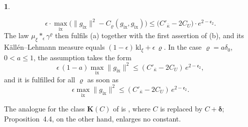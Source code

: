 \documentclass[11pt]{amsart}
\newcommand{\namedhead}{}
\theoremstyle{definition}
\newtheorem*{namedinner}{\namedhead}
\newenvironment{named}[1]{\renewcommand{\namedhead}{#1}\begin{namedinner}}{\end{namedinner}}
\begin{document}
\begin{named}{Proposition 4.4}
\begin{itemize}
\begin{equation*}
\epsilon\cdot\max_{\mathrm{ix}}\bigl(\|g_{\mathrm{ix}}\|^2-C_\varrho(g_{\mathrm{ix}},g_{\mathrm{ix}})\bigr)\le\bigl(C'_{\bar\kappa}-2C_U\bigr)\cdot e^{2-\mathfrak e_2}.
\end{equation*}
The law $\mu_\xi\ast_\epsilon\gamma^\varrho$ then fulfils (a) together with the first assertion of (b), and its K\"all\'en--Lehmann measure equals $(1-\epsilon)\,\mathrm{kl}_\xi+\epsilon\,\varrho$.
In the case $\varrho=a\delta_0$, $0<a\le1$, the assumption takes the form
\begin{equation*}
\epsilon\,(1-a)\max_{\mathrm{ix}}\|g_{\mathrm{ix}}\|^2\le(C'_{\bar\kappa}-2C_U)\,e^{2-\mathfrak e_2},
\end{equation*}
and it is fulfilled for all $\varrho$ as soon as
\begin{equation*}
\epsilon\max_{\mathrm{ix}}\|g_{\mathrm{ix}}\|^2\le(C'_{\bar\kappa}-2C_U)\,e^{2-\mathfrak e_2}.
\end{equation*}
\end{itemize}
\end{named}

The analogue for the class $\mathbf K(C)$ of \cite{QEDI} is \cite[Proposition~21.40\,(a)]{QEDI}, where $C$ is replaced by $C+\boldsymbol\delta$; Proposition~4.4, on the other hand, enlarges no constant.
\end{document}

